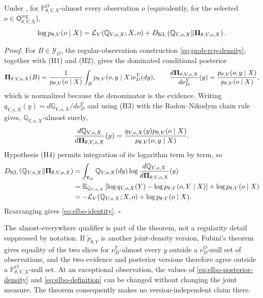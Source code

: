 Under , for \(\mathbb P_{\theta,V,X}^{O}\)-almost every observation \(o\) (equivalently, for the selected \(o\in\mathsf O_{\theta,V,X}^{\mathrm{reg}}\)),
\begin{equation}
\log p_{\theta,V}(o\mid X)
=\mathcal L_V(\mathbb Q_{V,o,X};X,o)
+D_{\mathrm{KL}}\left(
\mathbb Q_{V,o,X}
\middle\Vert
\boldsymbol\Pi_{\theta,V,o,X}
\right).
\label{eq:elbo-identity}
\end{equation}

\emph{Proof.} For \(B\in\mathscr Y_D\), the regular-observation construction \eqref{eq:prob-rcp-density}, together with (H1) and (H2), gives the dominated conditional posterior
\begin{equation}
\boldsymbol\Pi_{\theta,V,o,X}(B)
=\frac{1}{p_{\theta,V}(o\mid X)}
\int_{B}p_{\theta,V}(o,y\mid X)\nu_D^Y(dy),
\qquad
\frac{d\boldsymbol\Pi_{\theta,V,o,X}}{d\nu_D^Y}(y)
=\frac{p_{\theta,V}(o,y\mid X)}{p_{\theta,V}(o\mid X)},
\label{eq:elbo-posterior-density}
\end{equation}
which is normalized because the denominator is the evidence. Writing \(q_{V,o,X}(y)=d\mathbb Q_{V,o,X}/d\nu_D^Y\) and using (H3) with the Radon--Nikodym chain rule gives, \(\mathbb Q_{V,o,X}\)-almost surely,
\begin{equation}
\frac{d\mathbb Q_{V,o,X}}{d\boldsymbol\Pi_{\theta,V,o,X}}(y)
=\frac{q_{V,o,X}(y)p_{\theta,V}(o\mid X)}
{p_{\theta,V}(o,y\mid X)}.
\label{eq:elbo-rn-ratio}
\end{equation}
Hypothesis (H4) permits integration of its logarithm term by term, so
\begin{align}
D_{\mathrm{KL}}\left(
\mathbb Q_{V,o,X}
\middle\Vert
\boldsymbol\Pi_{\theta,V,o,X}
\right)
&=\int_{\mathsf Y_D}
\mathbb Q_{V,o,X}(dy)
\log\frac{d\mathbb Q_{V,o,X}}
{d\boldsymbol\Pi_{\theta,V,o,X}}(y)
\label{eq:elbo-kl-expansion}\\
&=\mathbb E_{\mathbb Q_{V,o,X}}\left[
\log q_{V,o,X}(Y)-\log p_{\theta,V}(o,Y\mid X)
\right]
+\log p_{\theta,V}(o\mid X)\notag\\
&=-\mathcal L_V(\mathbb Q_{V,o,X};X,o)
+\log p_{\theta,V}(o\mid X).\notag
\end{align}
Rearranging gives \eqref{eq:elbo-identity}. \hfill\(\square\)

The almost-everywhere qualifier is part of the theorem, not a regularity detail suppressed by notation. If \(\widetilde p_{\theta,V}\) is another joint-density version, Fubini's theorem gives equality of the two slices for \(\nu_D^Y\)-almost every \(y\) outside a \(\nu_D^O\)-null set of observations, and the two evidence and posterior versions therefore agree outside a \(\mathbb P_{\theta,V,X}^{O}\)-null set. At an exceptional observation, the values of \eqref{eq:elbo-posterior-density} and \eqref{eq:elbo-definition} can be changed without changing the joint measure. The theorem consequently makes no version-independent claim there.

